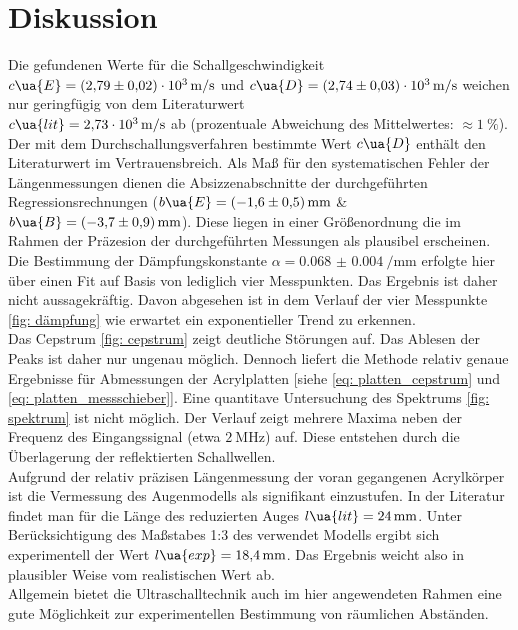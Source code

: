 \newpage
\section{Diskussion}
Die gefundenen Werte für die Schallgeschwindigkeit $c\ua{E} = \SI{+2.79(2)e+03}{\meter\per\second}$ und
$c\ua{D} = \SI{+2.74(3)e+03}{\meter\per\second}$ weichen nur geringfügig von dem Literaturwert\\
$c\ua{lit} = \SI{2.73e3}{\meter\per\second}$ ab (prozentuale Abweichung des Mittelwertes: $\approx \SI{1}{\percent}$). %
Der mit dem Durchschallungsverfahren bestimmte Wert $c\ua{D}$
enthält den Literaturwert im Vertrauensbreich. Als Maß für den systematischen Fehler der Längenmessungen dienen
die Absizzenabschnitte der durchgeführten Regressionsrechnungen ($b\ua{E} = \SI{-1.6(5)}{\milli\meter}$ \&
$b\ua{B} = \SI{-3.7(9)}{\milli\meter}$). Diese liegen in einer Größenordnung die im Rahmen der Präzesion
der durchgeführten Messungen als plausibel erscheinen. \\
Die Bestimmung der Dämpfungskonstante $\alpha = \SI{0.068(4)}{\per\milli\meter}$ erfolgte hier über einen Fit
auf Basis von lediglich vier Messpunkten. Das Ergebnis ist daher nicht aussagekräftig. Davon abgesehen ist in
dem Verlauf der vier Messpunkte \ref{fig: dämpfung} wie erwartet ein exponentieller Trend zu erkennen.\\
Das Cepstrum \ref{fig: cepstrum} zeigt deutliche Störungen auf. Das Ablesen der Peaks ist daher nur ungenau möglich.
Dennoch liefert die Methode relativ genaue Ergebnisse für Abmessungen der Acrylplatten [siehe \ref{eq: platten_cepstrum} und \ref{eq: platten_messschieber}].
Eine quantitave Untersuchung des Spektrums \ref{fig: spektrum} ist nicht möglich. Der Verlauf zeigt mehrere %
Maxima neben der Frequenz des Eingangssignal (etwa $\SI{2}{\mega\hertz}$) auf. Diese entstehen durch die Überlagerung der
reflektierten Schallwellen. \\
Aufgrund der relativ präzisen Längenmessung der voran gegangenen Acrylkörper ist die Vermessung des Augenmodells als
signifikant einzustufen. In der Literatur \cite{sehen} findet man für die Länge des reduzierten Auges $l\ua{lit} = \SI{24}{\milli\meter}$. Unter
Berücksichtigung des Maßstabes 1:3 des verwendet Modells ergibt sich experimentell der Wert $l\ua{exp} = \SI{18.4}{\milli\meter}$. Das Ergebnis
weicht also in plausibler Weise vom realistischen Wert ab. \\
Allgemein bietet die Ultraschalltechnik auch im hier angewendeten Rahmen eine gute Möglichkeit zur experimentellen Bestimmung
von räumlichen Abständen.
